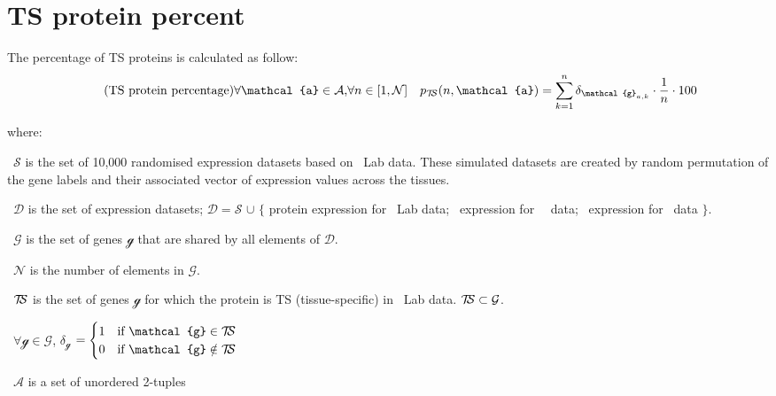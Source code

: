 \begin{minipage}{\textwidth}
\section{TS protein percent}
The percentage of \gls{TS} proteins is calculated as follow:\mybr\
\begin{equation}
    \tag{TS protein percentage}\label{eq:SpeCor}
    \forall \mathcal{a} \in \mathcal{A}\text{,} \forall n \in [1,\mathcal{N}]
    \text{\quad}
    p_{\TSm} (n,\mathcal{a}) =%
    \displaystyle\sum_{k=1}^{n}\delta_{\mathcal{g}_{a,k}}\cdot\frac{1}{n}\cdot100
\end{equation}

    where:
    \quad\begin{eqlist}[\setlength{\itemsep}{0em}%
        \setlength{\topsep}{0em}%
        \setlength{\partopsep}{0em}%
        \setlength{\parskip}{0em}%
        \setlength{\parsep}{0em}]
    \item[\textbullet\ $\mathcal{S}$] is the set of 10,000
        randomised expression datasets based on \pandey\ Lab data.
        These simulated datasets are created
        by random permutation of the gene labels and
        their associated vector of expression values across the tissues.
    \item[\textbullet\ $\mathcal{D}$] is the set of expression datasets;
        $\mathcal{D}=\mathcal{S}$ $\cup$
        $\{$ protein expression for \pandey\ Lab data;
        \mRNA\ expression for \uhlen\ \etal\ data;
        \mRNA\ expression for \gtex\ data $\}$.
    \item[\textbullet\ $\mathcal{G}$] is the set of genes $\mathcal{g}$
        that are shared by all elements of $\mathcal{D}$.
    \item[\textbullet\ $\mathcal{N}$] is the number of elements
        in $\mathcal{G}$.
    \item[\textbullet\ $\TSm$] is the set of genes $\mathcal{g}$
        for which the protein is \gls{TS} (tissue-specific)
        in \pandey\ Lab data.
        $\TSm \subset \mathcal{G}$.
    \item[\textbullet\ $\forall \mathcal{g} \in \mathcal{G}$,
        $\delta_{\mathcal{g}}$]$=\begin{cases}
            1 & \text{if $\mathcal{g} \in \TSm$}\\
            0 & \text{if $\mathcal{g} \notin \TSm$}
        \end{cases}       $
         \item[\textbullet\ $\mathcal{A}$] is a set of unordered 2-tuples

\end{eqlist}
\end{minipage}
